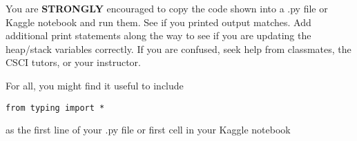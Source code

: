 \documentclass{article}
\begin{document}
You are \textbf{STRONGLY} encouraged to copy the code shown into a .py file or Kaggle notebook and run them. See if you printed output matches. Add additional print statements along the way to see if you are updating the heap/stack variables correctly. If you are confused, seek help from classmates, the CSCI tutors, or your instructor.

\vspace{0.2in}
For all, you might find it useful to include 
\vspace{0.1in}

\verb|from typing import *|

\vspace{0.1in}

as the first line of your .py file or first cell in your Kaggle notebook
\end{document}
